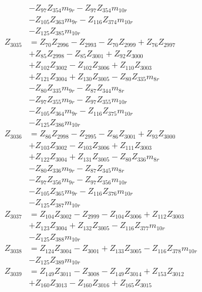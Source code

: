 \begin{multicols}{2}
\begin{align}
&- Z_{97}Z_{354}m_{9r} - Z_{97}Z_{354}m_{10r}  \nonumber \\
&- Z_{105}Z_{363}m_{9r} - Z_{116}Z_{374}m_{10r}  \nonumber \\
&- Z_{125}Z_{385}m_{10r} \nonumber \\
Z_{3035} &= Z_{70}Z_{2996} - Z_{2993} - Z_{70}Z_{2999} + Z_{76}Z_{2997}  \nonumber \\
&+ Z_{85}Z_{2998} - Z_{85}Z_{3001} + Z_{92}Z_{3000}  \nonumber \\
&+ Z_{102}Z_{3002} - Z_{102}Z_{3006} + Z_{110}Z_{3003}  \nonumber \\
&+ Z_{121}Z_{3004} + Z_{130}Z_{3005} - Z_{80}Z_{335}m_{8r}  \nonumber \\
&- Z_{80}Z_{335}m_{9r} - Z_{87}Z_{344}m_{8r}  \nonumber \\
&- Z_{97}Z_{355}m_{9r} - Z_{97}Z_{355}m_{10r}  \nonumber \\
&- Z_{105}Z_{364}m_{9r} - Z_{116}Z_{375}m_{10r}  \nonumber \\
&- Z_{125}Z_{386}m_{10r} \nonumber \\
Z_{3036} &= Z_{86}Z_{2998} - Z_{2995} - Z_{86}Z_{3001} + Z_{93}Z_{3000}  \nonumber \\
&+ Z_{103}Z_{3002} - Z_{103}Z_{3006} + Z_{111}Z_{3003}  \nonumber \\
&+ Z_{122}Z_{3004} + Z_{131}Z_{3005} - Z_{80}Z_{336}m_{8r}  \nonumber \\
&- Z_{80}Z_{336}m_{9r} - Z_{87}Z_{345}m_{8r}  \nonumber \\
&- Z_{97}Z_{356}m_{9r} - Z_{97}Z_{356}m_{10r}  \nonumber \\
&- Z_{105}Z_{365}m_{9r} - Z_{116}Z_{376}m_{10r}  \nonumber \\
&- Z_{125}Z_{387}m_{10r} \nonumber \\
Z_{3037} &= Z_{104}Z_{3002} - Z_{2999} - Z_{104}Z_{3006} + Z_{112}Z_{3003}  \nonumber \\
&+ Z_{123}Z_{3004} + Z_{132}Z_{3005} - Z_{116}Z_{377}m_{10r}  \nonumber \\
&- Z_{125}Z_{388}m_{10r} \nonumber \\
Z_{3038} &= Z_{124}Z_{3004} - Z_{3001} + Z_{133}Z_{3005} - Z_{116}Z_{378}m_{10r}  \nonumber \\
&- Z_{125}Z_{389}m_{10r} \nonumber \\
Z_{3039} &= Z_{149}Z_{3011} - Z_{3008} - Z_{149}Z_{3014} + Z_{153}Z_{3012}  \nonumber \\
&+ Z_{160}Z_{3013} - Z_{160}Z_{3016} + Z_{165}Z_{3015}  \nonumber \\

\end{align}
\end{multicols}
